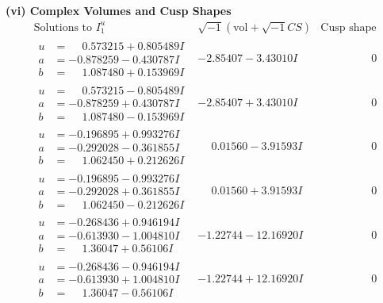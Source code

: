 \documentclass[1p]{elsarticle_modified}
\theoremstyle{definition}
\newcommand{\I}{\sqrt{-1}}
\begin{document}
\newpage\flushleft \textbf{(vi) Complex Volumes and Cusp Shapes}
$$\begin{array}{c|c|c}  
\text{Solutions to }I^u_{1}& \I (\text{vol} + \sqrt{-1}CS) & \text{Cusp shape}\\
 \hline 
\begin{aligned}
u &= \phantom{-}0.573215 + 0.805489 I \\
a &= -0.878259 - 0.430787 I \\
b &= \phantom{-}1.087480 + 0.153969 I\end{aligned}
 & -2.85407 - 3.43010 I & \phantom{-0.000000 } 0 \\ \hline\begin{aligned}
u &= \phantom{-}0.573215 - 0.805489 I \\
a &= -0.878259 + 0.430787 I \\
b &= \phantom{-}1.087480 - 0.153969 I\end{aligned}
 & -2.85407 + 3.43010 I & \phantom{-0.000000 } 0 \\ \hline\begin{aligned}
u &= -0.196895 + 0.993276 I \\
a &= -0.292028 - 0.361855 I \\
b &= \phantom{-}1.062450 + 0.212626 I\end{aligned}
 & \phantom{-}0.01560 - 3.91593 I & \phantom{-0.000000 } 0 \\ \hline\begin{aligned}
u &= -0.196895 - 0.993276 I \\
a &= -0.292028 + 0.361855 I \\
b &= \phantom{-}1.062450 - 0.212626 I\end{aligned}
 & \phantom{-}0.01560 + 3.91593 I & \phantom{-0.000000 } 0 \\ \hline\begin{aligned}
u &= -0.268436 + 0.946194 I \\
a &= -0.613930 - 1.004810 I \\
b &= \phantom{-}1.36047 + 0.56106 I\end{aligned}
 & -1.22744 - 12.16920 I & \phantom{-0.000000 } 0 \\ \hline\begin{aligned}
u &= -0.268436 - 0.946194 I \\
a &= -0.613930 + 1.004810 I \\
b &= \phantom{-}1.36047 - 0.56106 I\end{aligned}
 & -1.22744 + 12.16920 I & \phantom{-0.000000 } 0 \\ \hline\begin{aligned}

\end{aligned}
\end{array}$$
\end{document}
